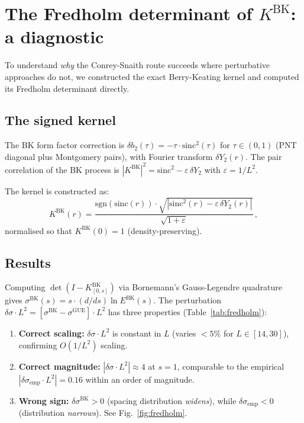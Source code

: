 \documentclass[11pt]{article}
\begin{document}
\section{The Fredholm determinant of $K^{\mathrm{BK}}$: a diagnostic}
\label{sec:fredholm}

To understand \emph{why} the Conrey-Snaith route succeeds where perturbative
approaches do not, we constructed the exact Berry-Keating kernel and computed
its Fredholm determinant directly.

\subsection{The signed kernel}

The BK form factor correction is $\delta b_2(\tau) = -\tau \cdot \mathrm{sinc}^2(\tau)$
for $\tau \in (0,1)$ (PNT diagonal plus Montgomery pairs), with Fourier
transform $\delta Y_2(r)$. The pair correlation of the BK process is
$|K^{\mathrm{BK}}|^2 = \mathrm{sinc}^2 - \varepsilon\,\delta Y_2$
with $\varepsilon = 1/L^2$.

The kernel is constructed as:
\begin{equation}
K^{\mathrm{BK}}(r) = \frac{\mathrm{sgn}(\mathrm{sinc}(r)) \cdot
\sqrt{|\mathrm{sinc}^2(r) - \varepsilon\,\delta Y_2(r)|}}
{\sqrt{1 + \varepsilon}}\,,
\label{eq:KBK}
\end{equation}
normalised so that $K^{\mathrm{BK}}(0) = 1$ (density-preserving).

\subsection{Results}

Computing $\det(I - K^{\mathrm{BK}}_{[0,s]})$ via Bornemann's Gauss-Legendre
quadrature~\cite{bornemann2010} gives $\sigma^{\mathrm{BK}}(s) = s \cdot
(d/ds) \ln E^{\mathrm{BK}}(s)$. The perturbation
$\delta\sigma \cdot L^2 = [\sigma^{\mathrm{BK}} - \sigma^{\mathrm{GUE}}] \cdot L^2$
has three properties (Table~\ref{tab:fredholm}):

\begin{enumerate}
\item \textbf{Correct scaling:} $\delta\sigma \cdot L^2$ is constant in $L$
(varies $< 5\%$ for $L \in [14, 30]$), confirming $O(1/L^2)$ scaling.
\item \textbf{Correct magnitude:} $|\delta\sigma \cdot L^2| \approx 4$ at $s = 1$,
comparable to the empirical $|\delta\sigma_{\mathrm{emp}} \cdot L^2| = 0.16$
within an order of magnitude.
\item \textbf{Wrong sign:} $\delta\sigma^{\mathrm{BK}} > 0$ (spacing distribution
\emph{widens}), while $\delta\sigma_{\mathrm{emp}} < 0$ (distribution
\emph{narrows}). See Fig.~\ref{fig:fredholm}.
\end{enumerate}
\end{document}
